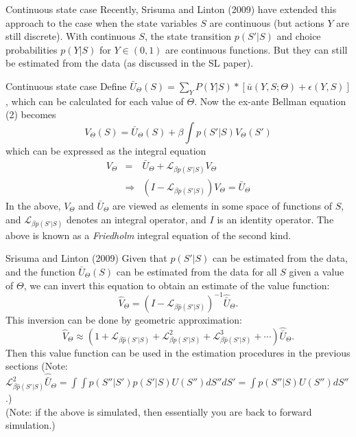 \documentclass[aspectratio=169,11pt]{beamer}
\begin{document}
\begin{frame}{Continuous state case}
Recently, Srisuma and Linton (2009) have extended this approach to the case when the state variables $S$ are continuous (but actions $Y$ are still discrete). With continuous $S$, the state transition $p(S'|S)$ and choice probabilities $p(Y|S)$ for $Y \in (0,1)$ are continuous functions. But they can still be estimated from the data (as discussed in the SL paper). \\
\end{frame}

\begin{frame}{Continuous state case}
Define $\bar U_\Theta (S) = \sum_Y P(Y|S) * [ \bar u (Y,S;\Theta) + \epsilon(Y,S)]$, which can be calculated for each value of $\Theta$. Now the ex-ante Bellman equation (2) becomes
\begin{equation*}
V_\Theta (S) = \bar U_\Theta (S) + \beta \int p(S'|S) V_\Theta(S')
\end{equation*}
which can be expressed as the integral equation
\begin{eqnarray*}
V_\Theta &=& \bar U_\Theta + \mathcal{L}_{\beta p (S'|S)} V_\Theta \\
&\Rightarrow& (I - \mathcal{L}_{\beta p (S'|S)})V_\Theta = \bar U_\Theta
\end{eqnarray*}
In the above, $V_\Theta$ and $\bar U_\Theta$ are viewed as elements in some space of functions of $S$, and $\mathcal{L}_{\beta p (S'|S)}$ denotes an integral operator, and $I$ is an identity operator. The above is known as a \emph{Friedholm} integral equation of the second kind.
\end{frame}


\begin{frame}{Srisuma and Linton (2009)}
Given that $p(S'|S)$ can be estimated from the data, and the function $\bar U_\Theta (S)$ can be estimated from the data for all $S$ given a value of $\Theta$, we can invert this equation to obtain an estimate of the value function:
\begin{equation*}
\hat V_\Theta = (I - \mathcal{L}_{\beta \hat p (S'|S)})^{-1} \hat{\bar U}_{\Theta}.
\end{equation*}
This inversion can be done by geometric approximation:
\begin{equation*}
\hat V_\Theta \approx (1 +  \mathcal{L}_{\beta \hat p (S'|S)} + \mathcal{L}^2_{\beta \hat p (S'|S)} + \mathcal{L}^3_{\beta \hat p (S'|S)} + \cdots ) \hat{\bar U}_{\Theta}.
\end{equation*}
Then this value function can be used in the estimation procedures in the previous sections
 (Note: $\mathcal{L}^2_{\beta \hat p (S'|S)}\hat{\bar U}_{\Theta} = \int \int p(S''|S') p(S'|S) U(S'')dS''dS' = \int p(S''|S) U(S'') dS''$.)\\ 
 \vspace{0.5cm}
(Note: if the above is simulated, then essentially you are back to forward simulation.)
\end{frame}
\end{document}
